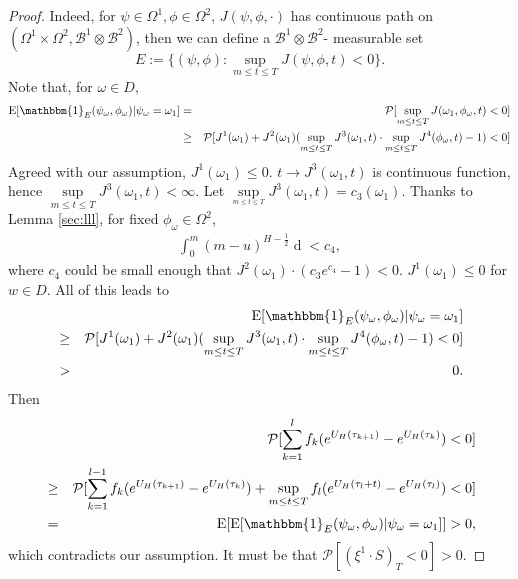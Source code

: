 \documentclass[a4paper, twoside, 11pt]{article}
\theoremstyle{definition}
\begin{document}
\begin{proof}
  Indeed, for $\psi\in\Omega^1, \phi\in\Omega^2$, $J(\psi, \phi, \cdot)$ has continuous path on $(\Omega^1 \times \Omega^2, \mathscr{B}^1\otimes\mathscr{B}^2)$, then we can define a $\mathscr{B}^1\otimes\mathscr{B}^2$- measurable set
  $$
  E := \{(\psi, \phi) : \sup\limits_{m\le t\le T} J(\psi, \phi, t) < 0\}.
  $$
  Note that, for $\omega \in D$,
  \begin{eqnarray*}
	\mathrm{E} [\mathbbm{1}_{E}(\psi_{\omega}, \phi_{\omega})| \psi_{\omega}=\omega_1] &=& \mathcal{P}[\sup\limits_{m\le t \le T} J(\omega_1, \phi_{\omega}, t) < 0] \\
	&\ge& \mathcal{P}[J^1(\omega_1) + J^2(\omega_1) (\sup\limits_{m\le t \le T}J^3(\omega_1, t) \cdot \sup\limits_{m\le t \le T}J^4(\phi_{\omega}, t) - 1) < 0]
  \end{eqnarray*}
  Agreed with our assumption, $J^1(\omega_1) \le 0$.  $t \rightarrow J^3(\omega_1, t)$ is continuous function, hence $\sup\limits_{m\le t\le T} J^3(\omega_1, t) < \infty$. Let $ \sup\limits_{_{m\le t \le T}}J^3(\omega_1, t) = c_3(\omega_1)$. Thanks to Lemma \ref{sec:lll}, for fixed $\phi_{\omega} \in \Omega^2$,
  \begin{eqnarray*}
	\int_0^{m}(m-u)^{H-\frac{1}{2}}\mathop{d \phi_{\omega}(u)} < c_4,
  \end{eqnarray*}
  where $c_4$ could be small enough that $J^2(\omega_1) \cdot (c_3e^{c_4} - 1) < 0 $. $J^1(\omega_1) \le 0$ for $w\in D$. All of this leads to 
  \begin{eqnarray*}
	&& \mathrm{E} [\mathbbm{1}_{E}(\psi_{\omega}, \phi_{\omega})| \psi_{\omega}=\omega_1]\\ 
	&\ge& \mathcal{P}[J^1(\omega_1) + J^2(\omega_1) (\sup\limits_{m\le t \le T}J^3(\omega_1, t) \cdot \sup\limits_{m\le t \le T}J^4(\phi_{\omega}, t) - 1) < 0]\\
	&>& 0.
  \end{eqnarray*}
  Then
  \begin{eqnarray*}
	&&\mathcal{P}[\sum_{k=1}^{l} f_k (e^{U_H(\tau_{k+1})} - e^{U_H(\tau_k)}) < 0] \\
  &\ge&\mathcal{P}[\sum_{k=1}^{l-1} f_k (e^{U_H(\tau_{k+1})}  - e^{U_H(\tau_{k})}) +  \sup\limits_{m\le t \le T}f_l(e^{U_H(\tau_l+t)}-e^{U_H(\tau_l)})  < 0]\\
  &=& \mathrm{E}[ \mathrm{E} [\mathbbm{1}_{E}(\psi_{\omega}, \phi_{\omega})| \psi_{\omega}=\omega_1]] > 0,
  \end{eqnarray*}
  which contradicts our assumption. It must be that ${\mathcal{P}}[(\xi^1 \cdot S)_T < 0] > 0$.
  \end{proof}
\end{document}
